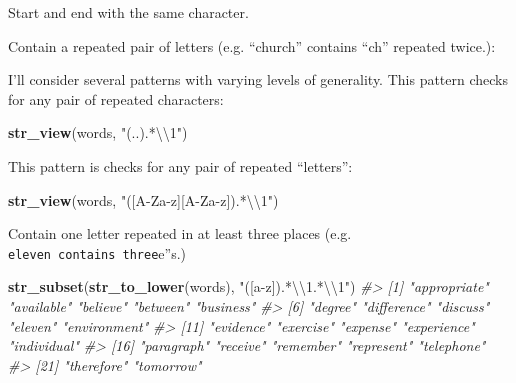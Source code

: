 \documentclass[]{book}
\newenvironment{Shaded}{\begin{snugshade}}{\end{snugshade}}
\newcommand{\CharTok}[1]{\textcolor[rgb]{0.31,0.60,0.02}{#1}}
\newcommand{\CommentTok}[1]{\textcolor[rgb]{0.56,0.35,0.01}{\textit{#1}}}
\newcommand{\DataTypeTok}[1]{\textcolor[rgb]{0.13,0.29,0.53}{#1}}
\newcommand{\KeywordTok}[1]{\textcolor[rgb]{0.13,0.29,0.53}{\textbf{#1}}}
\newcommand{\NormalTok}[1]{#1}
\newcommand{\OperatorTok}[1]{\textcolor[rgb]{0.81,0.36,0.00}{\textbf{#1}}}
\newcommand{\OtherTok}[1]{\textcolor[rgb]{0.56,0.35,0.01}{#1}}
\newcommand{\StringTok}[1]{\textcolor[rgb]{0.31,0.60,0.02}{#1}}
\theoremstyle{plain}
\theoremstyle{remark}
\theoremstyle{definition}
\theoremstyle{definition}
\theoremstyle{definition}
\theoremstyle{remark}
\begin{document}
Start and end with the same character.

\begin{Shaded}
\end{Shaded}

Contain a repeated pair of letters (e.g. ``church'' contains ``ch''
repeated twice.):

I'll consider several patterns with varying levels of generality. This
pattern checks for any pair of repeated characters:

\begin{Shaded}
\begin{Highlighting}[]
\KeywordTok{str_view}\NormalTok{(words, }\StringTok{"(..).*}\CharTok{\textbackslash{}\textbackslash{}}\StringTok{1"}\NormalTok{)}
\end{Highlighting}
\end{Shaded}

This pattern is checks for any pair of repeated ``letters'':

\begin{Shaded}
\begin{Highlighting}[]
\KeywordTok{str_view}\NormalTok{(words, }\StringTok{"([A-Za-z][A-Za-z]).*}\CharTok{\textbackslash{}\textbackslash{}}\StringTok{1"}\NormalTok{)}
\end{Highlighting}
\end{Shaded}

Contain one letter repeated in at least three places (e.g.
\texttt{eleven\textquotesingle{}\textquotesingle{}\ contains\ three}e''s.)

\begin{Shaded}
\begin{Highlighting}[]
\KeywordTok{str_subset}\NormalTok{(}\KeywordTok{str_to_lower}\NormalTok{(words), }\StringTok{"([a-z]).*}\CharTok{\textbackslash{}\textbackslash{}}\StringTok{1.*}\CharTok{\textbackslash{}\textbackslash{}}\StringTok{1"}\NormalTok{)}
\CommentTok{#>  [1] "appropriate" "available"   "believe"     "between"     "business"   }
\CommentTok{#>  [6] "degree"      "difference"  "discuss"     "eleven"      "environment"}
\CommentTok{#> [11] "evidence"    "exercise"    "expense"     "experience"  "individual" }
\CommentTok{#> [16] "paragraph"   "receive"     "remember"    "represent"   "telephone"  }
\CommentTok{#> [21] "therefore"   "tomorrow"}
\end{Highlighting}
\end{Shaded}
\end{document}
